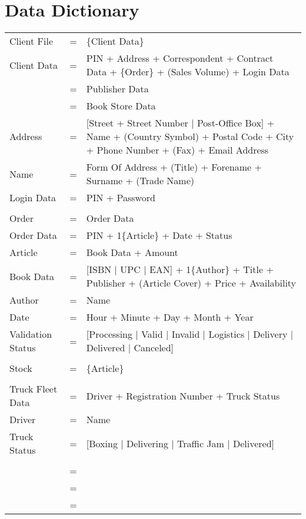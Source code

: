 \documentclass[12pt,a4paper]{article}
\begin{document}

\section{Data Dictionary}

\begin{comment}

Required Data (top level)
------------------------
Client File
Order
Stock

\end{comment}

\begin{tabular}{p{3.5cm}p{0.5cm}p{8.5cm}}
Client File & = & \{Client Data\} \\
Client Data & = & PIN + Address + Correspondent + Contract Data + \{Order\} + (Sales Volume) + Login Data \\
& = & Publisher Data\\
& = & Book Store Data\\
Address & = & [Street + Street Number $|$ Post-Office Box] + Name +  (Country Symbol) +  Postal Code + City + Phone Number + (Fax) + Email Address\\
Name & = & Form Of Address + (Title) + Forename + Surname + (Trade Name)\\
Login Data & = & PIN + Password \\
\\
Order & = & Order Data\\
Order Data & = & PIN + 1\{Article\} + Date + Status\\
Article & = & Book Data + Amount\\
Book Data & = & [ISBN $|$ UPC $|$ EAN] + 1\{Author\} + Title + Publisher + (Article Cover) + Price + Availability\\
Author & = & Name \\
Date & = & Hour + Minute + Day + Month + Year\\
Validation Status & = & [Processing $|$ Valid $|$ Invalid $|$ Logistics $|$ Delivery $|$ Delivered $|$ Canceled] \\
\\
Stock & = & \{Article\} \\
\\
Truck Fleet Data & = & Driver + Registration Number + Truck Status \\
Driver & = & Name \\
Truck Status & = & [Boxing $|$ Delivering $|$ Traffic Jam $|$ Delivered] \\
\\
& = &  \\
& = &  \\
& = &  \\
\end{tabular}
\end{document}
